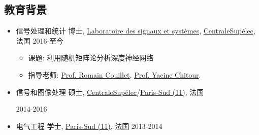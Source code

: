 \documentclass[margin]{res}
\begin{document}
 
\begin{CJK}{UTF8}{gbsn}

\address{{\bf 地址}\\ \href{http://www.centralesupelec.fr}{CentraleSup\'elec}, \href{http://www.l2s.centralesupelec.fr/}{L2S} \\A5. 03\\ 3 rue Joliot Curie \\ 91192, Gif-sur-Yvette, France\\ (+33)6-67-81-50-05 }
\address{{\bf 个人信息} \\ 生日: 28/Aug/1992 \\ 
性别: 男 \\
国籍: 中国 \\
邮件: \href{mailto:zhenyu.liao@l2s.centralesupelec.fr}{zhenyu.liao@l2s.centralesupelec.fr}\\
个人主页: \href{https://zhenyu-liao.github.io/}{https://zhenyu-liao.github.io/}
}


 
\begin{resume} 

\section{教育背景}
\begin{itemize} %
\item 信号处理和统计 博士, \href{https://www.l2s.centralesupelec.fr/}{Laboratoire des signaux et syst\`emes}, \href{http://www.centralesupelec.fr}{CentraleSup\'elec}, 法国 \hfill 2016-至今
\begin{itemize}
\item 课题: 利用随机矩阵论分析深度神经网络
\item 指导老师: \href{http://romaincouillet.hebfree.org/}{Prof. Romain Couillet}, \href{http://www.l2s.centralesupelec.fr/en/perso/yacine.chitour}{Prof. Yacine Chitour}.
\end{itemize}

\item 信号和图像处理 硕士, \href{http://www.centralesupelec.fr}{CentraleSup\'elec}/\href{http://www.u-psud.fr/en/index.html}{Paris-Sud (11)}, 法国
\begin{flushright}
2014-2016
\end{flushright}
\item  电气工程 学士, \href{http://www.u-psud.fr/en/index.html}{Paris-Sud (11)}, 法国
\hfill 2013-2014



\end{itemize}
\end{resume}
\end{CJK}
\end{document}
